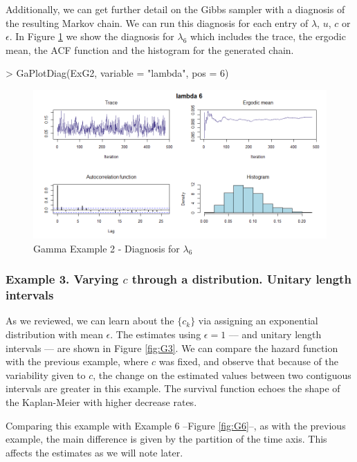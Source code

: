 \documentclass[letterpaper]{article}
\begin{document}
Additionally, we can get further detail on the Gibbs sampler with a diagnosis of the resulting Markov chain. We can run this diagnosis for each entry of $\lambda$, $u$, $c$ or $\epsilon$. In Figure \ref{fig:G2a} we show the diagnosis for $\lambda_6$ which includes the trace, the ergodic mean, the ACF function and the histogram for the generated chain.

\begin{Schunk}
\begin{Sinput}
> GaPlotDiag(ExG2, variable = "lambda", pos = 6)
\end{Sinput}
\end{Schunk}

\begin{figure}
  \centering
  \includegraphics[width=\textwidth]{G23.png}
  \caption{Gamma Example 2 - Diagnosis for $\lambda_6$}
  \label{fig:G2a}
\end{figure}

\subsubsection{Example 3. Varying $c$ through a distribution. Unitary length intervals}

As we reviewed, we can learn about the $\{c_k\}$ via assigning an exponential distribution with mean $\epsilon$. The estimates using $\epsilon = 1$ ---- and unitary length intervals ---- are shown in Figure \ref{fig:G3}. We can compare the hazard function with the previous example, where $c$ was fixed, and observe that because of the variability given to $c$, the change on the estimated values between two contiguous intervals are greater in this example. The survival function echoes the shape of the Kaplan-Meier with higher decrease rates. 

Comparing this example with Example 6 --Figure \ref{fig:G6}--, as with the previous example, the main difference is given by the partition of the time axis. This affects the estimates as we will note later.
\end{document}
